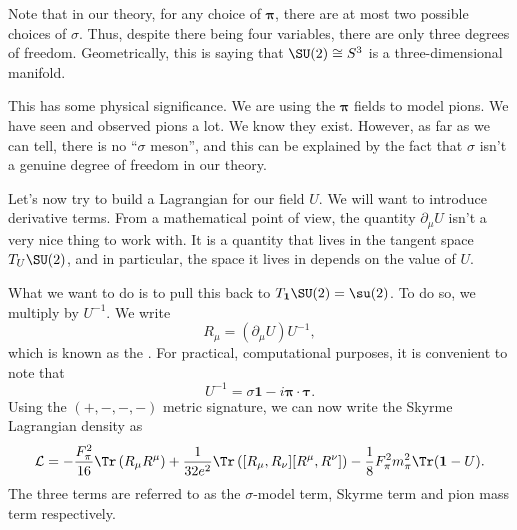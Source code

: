 \documentclass[a4paper]{article}
\begin{document}
%
%

Note that in our theory, for any choice of $\boldsymbol\pi$, there are at most two possible choices of $\sigma$. Thus, despite there being four variables, there are only three degrees of freedom. Geometrically, this is saying that $\SU(2) \cong S^3$ is a three-dimensional manifold.

This has some physical significance. We are using the $\boldsymbol\pi$ fields to model pions. We have seen and observed pions a lot. We know they exist. However, as far as we can tell, there is no ``$\sigma$ meson'', and this can be explained by the fact that $\sigma$ isn't a genuine degree of freedom in our theory.

Let's now try to build a Lagrangian for our field $U$. We will want to introduce derivative terms. From a mathematical point of view, the quantity $\partial_\mu U$ isn't a very nice thing to work with. It is a quantity that lives in the tangent space $T_U \SU(2)$, and in particular, the space it lives in depends on the value of $U$.

What we want to do is to pull this back to $T_\mathbf{1} \SU(2) = \su(2)$. To do so, we multiply by $U^{-1}$. We write
\[
  R_\mu = (\partial_\mu U)U^{-1},
\]
which is known as the . For practical, computational purposes, it is convenient to note that
\[
  U^{-1} = \sigma \mathbf{1} - i \boldsymbol\pi \cdot \boldsymbol\tau.
\]
Using the $(+, -, -, -)$ metric signature, we can now write the Skyrme Lagrangian density as
\[
  \mathcal{L} =-\frac{F_{\pi}^2 }{16} \Tr \left( R_\mu R^\mu\right) +\frac{1}{32e^2}\Tr\left([R_\mu, R_\nu][R^\mu, R^\nu]\right) - \frac{1}{8} F_\pi^2 m_\pi^2 \Tr(\mathbf{1} - U).
\]
The three terms are referred to as the $\sigma$-model term, Skyrme term and pion mass term respectively.
\end{document}
